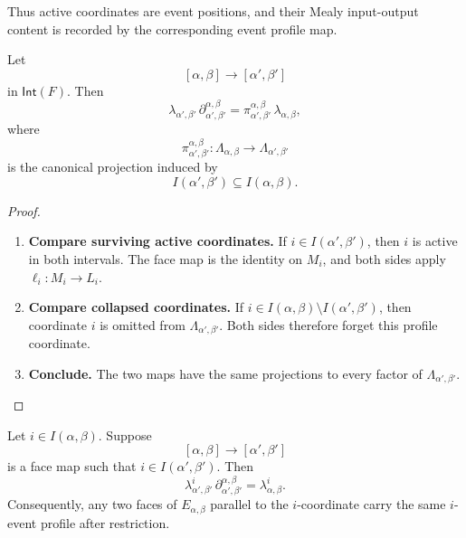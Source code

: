 Thus active coordinates are event positions, and their Mealy input-output
content is recorded by the corresponding event profile map.

\begin{proposition}
\label{prop:cmett-interval-profiles-compatible-faces}
    Let
    \[
        [\alpha,\beta]\to[\alpha',\beta']
    \]
    in \(\mathsf{Int}(F)\). Then
    \[
        \lambda_{\alpha',\beta'}\,
        \partial_{\alpha',\beta'}^{\alpha,\beta}
        =
        \pi_{\alpha',\beta'}^{\alpha,\beta}\,
        \lambda_{\alpha,\beta},
    \]
    where
    \[
        \pi_{\alpha',\beta'}^{\alpha,\beta}:
        \Lambda_{\alpha,\beta}\to\Lambda_{\alpha',\beta'}
    \]
    is the canonical projection induced by
    \[
        I(\alpha',\beta')\subseteq I(\alpha,\beta).
    \]
\end{proposition}

\begin{proof}
    \leavevmode
    \begin{enumerate}
        \item \textbf{Compare surviving active coordinates.}
        If \(i\in I(\alpha',\beta')\), then \(i\) is active in both
        intervals. The face map is the identity on \(M_i\), and both sides
        apply \(\ell_i:M_i\to L_i\).

        \item \textbf{Compare collapsed coordinates.}
        If \(i\in I(\alpha,\beta)\setminus I(\alpha',\beta')\), then
        coordinate \(i\) is omitted from
        \(\Lambda_{\alpha',\beta'}\). Both sides therefore forget this
        profile coordinate.

        \item \textbf{Conclude.}
        The two maps have the same projections to every factor of
        \(\Lambda_{\alpha',\beta'}\).
    \end{enumerate}
\end{proof}

\begin{proposition}
\label{prop:cmett-event-consistency}
    Let \(i\in I(\alpha,\beta)\). Suppose
    \[
        [\alpha,\beta]\to[\alpha',\beta']
    \]
    is a face map such that \(i\in I(\alpha',\beta')\). Then
    \[
        \lambda^i_{\alpha',\beta'}
        \,\partial_{\alpha',\beta'}^{\alpha,\beta}
        =
        \lambda^i_{\alpha,\beta}.
    \]
    Consequently, any two faces of \(E_{\alpha,\beta}\) parallel to the
    \(i\)-coordinate carry the same \(i\)-event profile after restriction.
\end{proposition}

